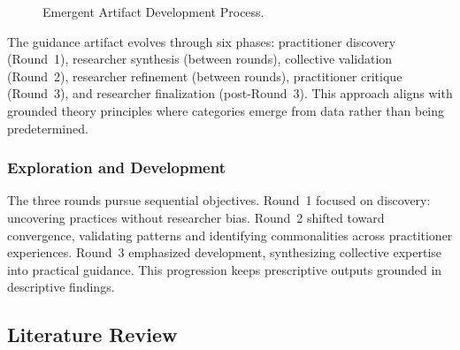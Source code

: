 \begin{figure}[H]
    \caption[Emergent artifact development process across six phases.]{Emergent Artifact Development Process.}\label{fig:emergent-artifact}
\end{figure}

The guidance artifact evolves through six phases: practitioner discovery (Round~1), researcher synthesis (between rounds), collective validation (Round~2), researcher refinement (between rounds), practitioner critique (Round~3), and researcher finalization (post-Round~3). This approach aligns with grounded theory principles
\parencite{charmaz_constructing_2014} where categories emerge from data rather
than being predetermined.

\subsubsection{Exploration and Development}

The three rounds pursue sequential objectives. Round~1 focused on discovery:
uncovering practices without researcher bias. Round~2 shifted toward
convergence, validating patterns and identifying commonalities across
practitioner experiences. Round~3 emphasized development, synthesizing
collective expertise into practical guidance. This progression keeps
prescriptive outputs grounded in descriptive findings.

\subsection{Literature Review}\label{subsec:literature-review}

